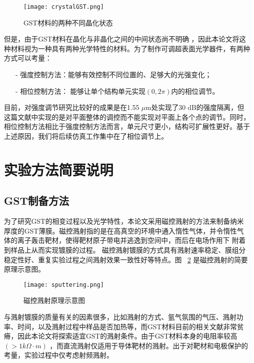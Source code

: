 \begin{figure}[H] %
  \centering
  \texttt{[image: crystalGST.png]}
  \caption{GST材料的两种不同晶化状态} \cite{intro01}
  \label{fig:cGST}
\end{figure}

但是，由于GST材料在晶化与非晶化之间的中间状态尚不明确 \cite{nature}，因此本论文将这种材料视为一种具有两种光学特性的材料。为了制作可调超表面光学器件，有两种方式可以考量：
  \begin{itemize}
    \item[-] 强度控制方法：能够有效控制不同位置的、足够大的光强变化；
    \item[-] 相位控制方法： 能够让单个结构单元实现$\left (0, 2\pi \right )$内的相位调节。
  \end{itemize}
目前，对强度调节研究比较好的成果是在1.55 $\mu$m处实现了30 dB的强度隔离\cite{isolation}，但这篇文献中实现的是对平面整体的调控而不能实现对平面上各个点的调节。同时，相位控制方法相比于强度控制方法而言，单元尺寸更小，结构可扩展性更好。基于上述原因，我们将后续仿真工作集中在了相位调节上。

\section{实验方法简要说明}
\label{sec:third}
\subsection{GST制备方法}
为了研究GST的相变过程以及光学特性，本论文采用磁控溅射的方法来制备纳米厚度的GST薄膜。磁控溅射指的是在高真空的环境中通入惰性气体，并令惰性气体的离子轰击靶材，使得靶材原子带电并逃逸到空间中，而后在电场作用下 附着到样品上从而实现镀膜的过程\cite{sputtering}。 磁控溅射镀膜的方式具有溅射速率稳定、膜组分稳定性好、重复实验过程之间溅射效果一致性好等特点。图 ~\ref{fig:sputtering} 是磁控溅射的简要原理示意图。
\begin{figure}[H] %
  \centering
  \texttt{[image: sputtering.png]}
  \caption{磁控溅射原理示意图}\cite{sputtering}
  \label{fig:sputtering}
\end{figure}

与溅射镀膜的质量有关的因素很多，比如溅射的方式、氩气氛围的气压、溅射功率、时间，以及溅射过程中样品是否加热等，而GST材料目前的相关文献非常贫瘠，因此本论文将探索适宜GST的溅射条件。由于GST材料本身的电阻率较高$\left ( >1 k \Omega \cdot{} m \right )$ \cite{ohmofGST}，而直流溅射仅适用于导体靶材的溅射。出于对靶材和电极保护的考量，实验过程中仅考虑射频溅射。

